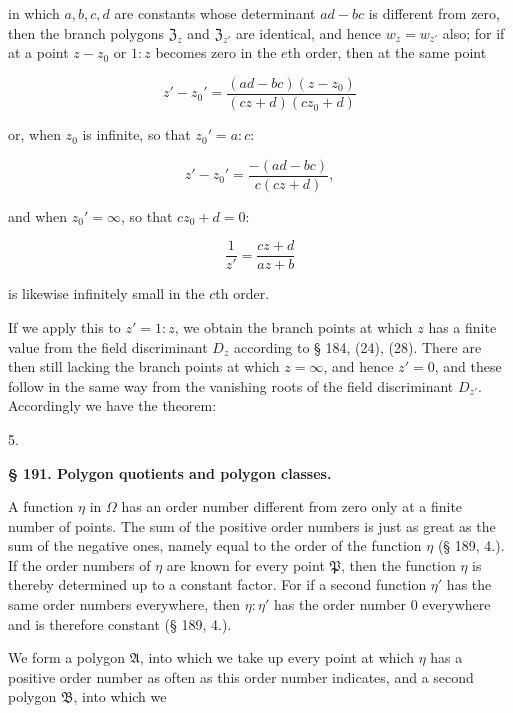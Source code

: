 in which $a, b, c, d$ are constants whose determinant $ad - bc$ is different from zero, then the branch polygons $\mathfrak{Z}_z$ and $\mathfrak{Z}_{z'}$ are identical, and hence $w_z = w_{z'}$ also; for if at a point $z-z_0$ or $1:z$ becomes zero in the $e$th order, then at the same point

\[
z' - z_0' = \dfrac{(ad-bc)(z-z_0)}{(cz+d)(cz_0+d)}
\]

or, when $z_0$ is infinite, so that $z_0' = a:c$:

\[
z' - z_0' = \dfrac{-(ad-bc)}{c(cz+d)},
\]

and when $z_0' = \infty$, so that $cz_0+d = 0$:

\[
\dfrac{1}{z'} = \dfrac{cz+d}{az+b}
\]

is likewise infinitely small in the $c$th order.

If we apply this to $z' = 1:z$, we obtain the branch points at which $z$ has a finite value from the field discriminant $D_z$ according to § 184, (24), (28). There are then still lacking the branch points at which $z=\infty$, and hence $z'=0$, and these follow in the same way from the vanishing roots of the field discriminant $D_{z'}$. Accordingly we have the theorem:

5. 

\begin{center}
\textbf{§ 191. Polygon quotients and polygon classes.}
\end{center}

A function $\eta$ in $\Omega$ has an order number different from zero only at a finite number of points. The sum of the positive order numbers is just as great as the sum of the negative ones, namely equal to the order of the function $\eta$ (§ 189, 4.). If the order numbers of $\eta$ are known for every point $\mathfrak{P}$, then the function $\eta$ is thereby determined up to a constant factor. For if a second function $\eta'$ has the same order numbers everywhere, then $\eta:\eta'$ has the order number $0$ everywhere and is therefore constant (§ 189, 4.).

We form a polygon $\mathfrak{A}$, into which we take up every point at which $\eta$ has a positive order number as often as this order number indicates, and a second polygon $\mathfrak{B}$, into which we
